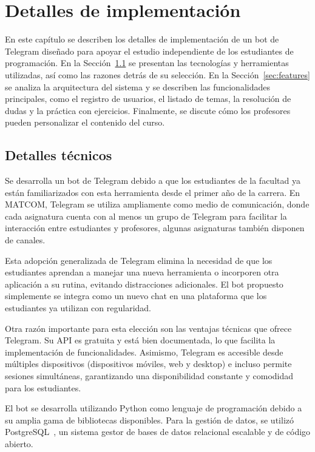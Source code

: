 \chapter{Detalles de implementación}\label{chapter:implementation}

En este capítulo se describen los detalles de implementación de un bot de Telegram diseñado para apoyar el estudio independiente de los estudiantes de programación. En la Sección~\ref{sec:technical-details} se presentan las tecnologías y herramientas utilizadas, así como las razones detrás de su selección. En la Sección~\ref{sec:features} se analiza la arquitectura del sistema y se describen las funcionalidades principales, como el registro de usuarios, el listado de temas, la resolución de dudas y la práctica con ejercicios. Finalmente, se discute cómo los profesores pueden personalizar el contenido del curso.

\section{Detalles técnicos}\label{sec:technical-details}

Se desarrolla un bot de Telegram debido a que los estudiantes de la facultad ya están familiarizados con esta herramienta desde el primer año de la carrera. En \mbox{MATCOM}, Telegram se utiliza ampliamente como medio de comunicación, donde cada asignatura cuenta con al menos un grupo de Telegram para facilitar la interacción entre estudiantes y profesores, algunas asignaturas también disponen de canales. 

Esta adopción generalizada de Telegram elimina la necesidad de que los estudiantes aprendan a manejar una nueva herramienta o incorporen otra aplicación a su rutina, evitando distracciones adicionales. El bot propuesto simplemente se integra como un nuevo chat en una plataforma que los estudiantes ya utilizan con regularidad.

Otra razón importante para esta elección son las ventajas técnicas que ofrece Telegram. Su API es gratuita y está bien documentada, lo que facilita la implementación de funcionalidades. Asimismo, Telegram es accesible desde múltiples dispositivos (dispositivos móviles, web y desktop) e incluso permite sesiones simultáneas, garantizando una disponibilidad constante y comodidad para los estudiantes.

El bot se desarrolla utilizando Python como lenguaje de programación debido a su amplia gama de bibliotecas disponibles. Para la gestión de datos, se utilizó PostgreSQL~\cite{postgresql}, un sistema gestor de bases de datos relacional escalable y de código abierto.

